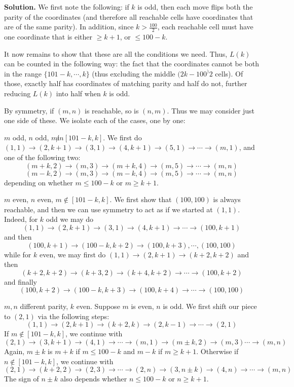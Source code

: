 \documentclass[11pt,a4paper]{article}
\begin{document}
	\textbf{Solution. }
	We first note the following: if $k$ is odd, then each move flips both the parity of the coordinates 
	(and therefore all reachable cells have coordinates that are of the same parity). 
	In addition, since $k > \frac{100}{2}$, each reachable cell must have one coordinate that is either $\ge k + 1$, 
	or $\le 100 - k$. 
	
	It now remains to show that these are all the conditions we need. 
	Thus, $L(k)$ can be counted in the following way: the fact that the coordinates cannot be both in the range 
	$\{101 - k, \cdots, k\}$ (thus excluding the middle $(2k - 100^)2$ cells). 
	Of those, exactly half has coordinates of matching parity and half do not, 
	further reducing $L(k)$ into half when $k$ is odd. 
	
	By symmetry, if $(m, n)$ is reachable, so is $(n, m)$. 
	Thus we may consider just one side of these. 
	We isolate each of the cases, one by one: 
	
	$m$ odd, $n$ odd, $m\not in [101 - k, k]$. 
	We first do $(1, 1) \to (2, k + 1)\to (3, 1)\to (4, k + 1)\to (5, 1)\to \cdots\to (m, 1)$, 
	and one of the following two: 
	\[
	(m + k, 2)\to (m, 3)\to (m + k, 4)\to (m, 5)\to \cdots\to (m, n)
	\]\[
	(m - k, 2)\to (m, 3)\to (m - k, 4)\to (m, 5)\to \cdots\to (m, n)
	\]
	depending on whether $m\le 100 - k$ or $m\ge k + 1$.  
	
	$m$ even, $n$ even, $m\not \in [101 - k, k]$. 
	We first show that $(100, 100)$ is always reachable, and then we can use symmetry to act as if we started at $(1, 1)$. 
	Indeed, for $k$ odd we may do 
	\[
	(1, 1) \to (2, k + 1)\to (3, 1)\to (4, k + 1)\to \cdots \to (100, k + 1)
	\]
	and then 
	\[
	(100, k + 1)\to (100 - k, k + 2) \to (100, k + 3), \cdots, (100, 100)
	\]
	while for $k$ even, we may first do $(1, 1) \to (2, k + 1)\to (k + 2, k + 2)$ and then 
	\[
	(k + 2, k + 2)\to (k + 3, 2) \to (k + 4, k + 2) \to \cdots \to (100, k + 2)
	\]
	and finally 
	\[
	(100, k + 2)\to (100 - k, k + 3) \to (100, k + 4) \to \cdots \to (100, 100)
	\]
	
	$m, n$ different parity, $k$ even. 
	Suppose $m$ is even, $n$ is odd. 
	We first shift our piece to $(2, 1)$ via the following steps: 
	\[
	(1, 1)\to (2, k + 1) \to (k + 2, k) \to (2, k - 1)\to \cdots \to (2, 1)
	\]
	If $m\not\in [101 - k, k]$, we continue with 
	\[
	(2, 1)\to (3, k + 1) \to (4, 1) \to \cdots \to (m, 1)
	\to (m\pm k, 2) \to (m, 3) \cdots \to (m, n)
	\]
	Again, $m\pm k$ is $m + k$ if $m\le 100 - k$ and $m - k$ if $m\ge k + 1$. 
	Otherwise if $n\not\in [101 - k, k]$, we continue with 
	\[
	(2, 1)\to (k + 2, 2)\to (2, 3)\to \cdots \to (2, n)
	\to (3, n\pm k)\to (4, n)\to \cdots \to (m, n)
	\]
	The sign of $n\pm k$ also depends whether $n\le 100-k$ or $n\ge k+1$. 
	
\end{document}
